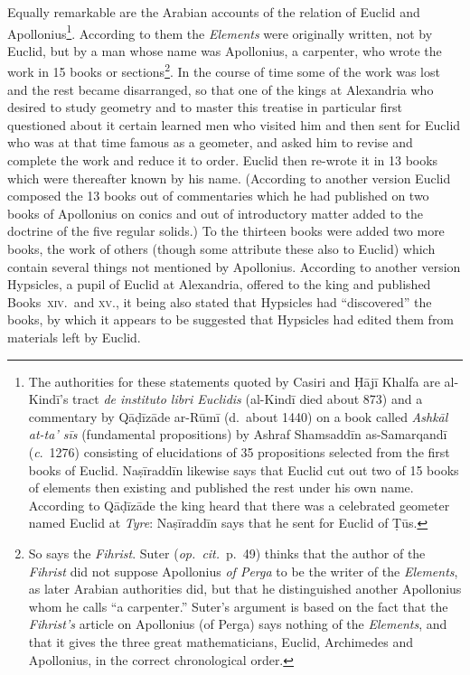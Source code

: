 Equally remarkable are the Arabian accounts of the relation of Euclid and Apollonius\footnote{The authorities for these statements quoted by Casiri and Ḥājī Khalfa are al-Kindī's tract \emph{de instituto libri Euclidis} (al-Kindī died about 873) and a commentary by Qāḍīzāde ar-Rūmī (d.~about 1440) on a book called \emph{Ashkāl at-ta' sīs} (fundamental propositions) by Ashraf Shamsaddīn as-Samarqandī (\emph{c}.~1276) consisting of elucidations of 35 propositions selected from the first books of Euclid. Naṣīraddīn likewise says that Euclid cut out two of 15 books of elements then existing and published the rest under his own name. According to Qāḍīzāde the king heard that there was a celebrated geometer named Euclid at \emph{Tyre}: Naṣīraddīn says that he sent for Euclid of Ṭūs.}. According to them the \emph{Elements} were originally written, not by Euclid, but by a man whose name was Apollonius, a carpenter, who wrote the work in 15 books or sections\footnote{So says the \emph{Fihrist}. Suter (\emph{op.~cit.}~p.~49) thinks that the author of the \emph{Fihrist} did not suppose Apollonius \emph{of Perga} to be the writer of the \emph{Elements}, as later Arabian authorities did, but that he distinguished another Apollonius whom he calls ``a carpenter.'' Suter's argument is based on the fact that the \emph{Fihrist's} article on Apollonius (of Perga) says nothing of the \emph{Elements}, and that it gives the three great mathematicians, Euclid, Archimedes and Apollonius, in the correct chronological order.}. In the course of time some of the work was lost and the rest became disarranged, so that one of the kings at Alexandria who desired to study geometry and to master this treatise in particular first questioned about it certain learned men who visited him and then sent for Euclid who was at that time famous as a geometer, and asked him to revise and complete the work and reduce it to order. Euclid then re-wrote it in 13 books which were thereafter known by his name. (According to another version Euclid composed the 13 books out of commentaries which he had published on two books of Apollonius on conics and out of introductory matter added to the doctrine of the five regular solids.) To the thirteen books were added two more books, the work of others (though some attribute these also to Euclid) which contain several things not mentioned by Apollonius. According to another version Hypsicles, a pupil of Euclid at Alexandria, offered to the king and published Books~\textsc{xiv.}\ and \textsc{xv.}, it being also stated that Hypsicles had ``discovered'' the books, by which it appears to be suggested that Hypsicles had edited them from materials left by Euclid.

